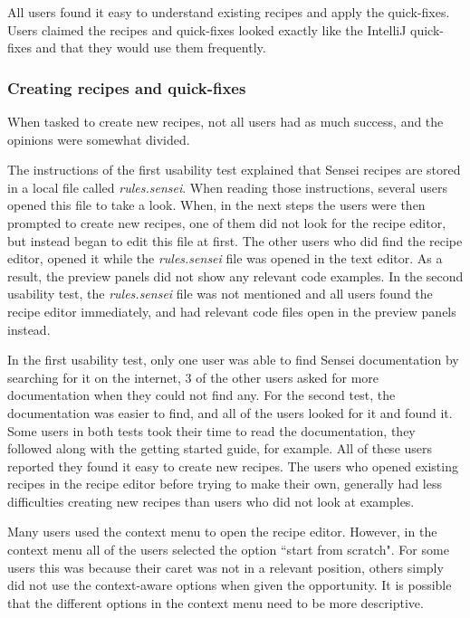 All users found it easy to understand existing recipes and apply the quick-fixes.
Users claimed the recipes and quick-fixes looked exactly like the IntelliJ quick-fixes and that they would use them frequently.

\subsubsection{Creating recipes and quick-fixes}
When tasked to create new recipes, not all users had as much success, and the opinions were somewhat divided.

The instructions of the first usability test explained that Sensei recipes are stored in a local file called \textit{rules.sensei}.
When reading those instructions, several users opened this file to take a look.
When, in the next steps the users were then prompted to create new recipes, one of them did not look for the recipe editor, but instead began to edit this file at first.
The other users who did find the recipe editor, opened it while the \textit{rules.sensei} file was opened in the text editor.
As a result, the preview panels did not show any relevant code examples.
In the second usability test, the \textit{rules.sensei} file was not mentioned and all users found the recipe editor immediately, and had relevant code files open in the preview panels instead.

In the first usability test, only one user was able to find Sensei documentation by searching for it on the internet, 3 of the other users asked for more documentation when they could not find any.
For the second test, the documentation was easier to find, and all of the users looked for it and found it.
Some users in both tests took their time to read the documentation, they followed along with the getting started guide, for example.
All of these users reported they found it easy to create new recipes.
The users who opened existing recipes in the recipe editor before trying to make their own, generally had less difficulties creating new recipes than users who did not look at examples.

Many users used the context menu to open the recipe editor.
However, in the context menu all of the users selected the option ``start from scratch".
For some users this was because their caret was not in a relevant position, others simply did not use the context-aware options when given the opportunity.
It is possible that the different options in the context menu need to be more descriptive.


